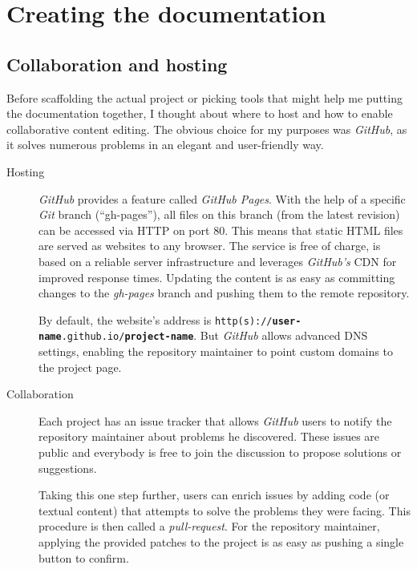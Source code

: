 \section{Creating the documentation}

\subsection{Collaboration and hosting}

Before scaffolding the actual project or picking tools that might help me putting the documentation together, I thought about where to host and how to enable collaborative content editing. The obvious choice for my purposes was \textit{GitHub}, as it solves numerous problems in an elegant and user-friendly way.

\begin{description}

	\item[Hosting]\hfill

	\textit{GitHub} provides a feature called \textit{GitHub Pages}. With the help of a specific \textit{Git} branch (\enquote{gh-pages}), all files on this branch (from the latest revision) can be accessed via \ac{HTTP} on port 80. This means that static \ac{HTML} files are served as websites to any browser. The service is free of charge, is based on a reliable server infrastructure and leverages \textit{GitHub's} \ac{CDN} for improved response times. Updating the content is as easy as committing changes to the \textit{gh-pages} branch and pushing them to the remote repository.

	By default, the website's address is \texttt{http(s)://\allowbreak\textbf{user-name}.github.io/\allowbreak\textbf{project-name}}. But \textit{GitHub} allows advanced \ac{DNS} settings, enabling the repository maintainer to point custom domains to the project page.

	\item[Collaboration]\hfill

	Each project has an issue tracker that allows \textit{GitHub} users to notify the repository maintainer about problems he discovered. These issues are public and everybody is free to join the discussion to propose solutions or suggestions.

	Taking this one step further, users can enrich issues by adding code (or textual content) that attempts to solve the problems they were facing. This procedure is then called a \textit{pull-request}. For the repository maintainer, applying the provided patches to the project is as easy as pushing a single button to confirm.


\end{description}
